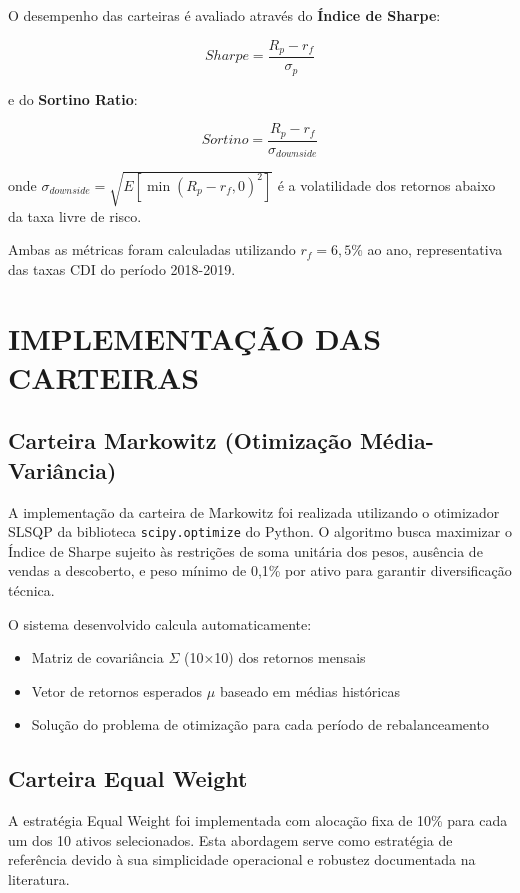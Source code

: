 O desempenho das carteiras é avaliado através do \textbf{Índice de Sharpe}:

\begin{equation}
Sharpe = \frac{R_p - r_f}{\sigma_p}
\end{equation}

e do \textbf{Sortino Ratio}:

\begin{equation}
Sortino = \frac{R_p - r_f}{\sigma_{downside}}
\end{equation}

onde $\sigma_{downside} = \sqrt{E[\min(R_p - r_f, 0)^2]}$ é a volatilidade dos retornos abaixo da taxa livre de risco.

Ambas as métricas foram calculadas utilizando $r_f = 6,5\%$ ao ano, representativa das taxas CDI do período 2018-2019.

\section{IMPLEMENTAÇÃO DAS CARTEIRAS}

\subsection{Carteira Markowitz (Otimização Média-Variância)}

A implementação da carteira de Markowitz foi realizada utilizando o otimizador SLSQP da biblioteca \texttt{scipy.optimize} do Python. O algoritmo busca maximizar o Índice de Sharpe sujeito às restrições de soma unitária dos pesos, ausência de vendas a descoberto, e peso mínimo de 0,1\% por ativo para garantir diversificação técnica.

O sistema desenvolvido calcula automaticamente:
\begin{itemize}
    \item Matriz de covariância $\Sigma$ (10×10) dos retornos mensais
    \item Vetor de retornos esperados $\mu$ baseado em médias históricas
    \item Solução do problema de otimização para cada período de rebalanceamento
\end{itemize}

\subsection{Carteira Equal Weight}

A estratégia Equal Weight foi implementada com alocação fixa de 10\% para cada um dos 10 ativos selecionados. Esta abordagem serve como estratégia de referência devido à sua simplicidade operacional e robustez documentada na literatura.

